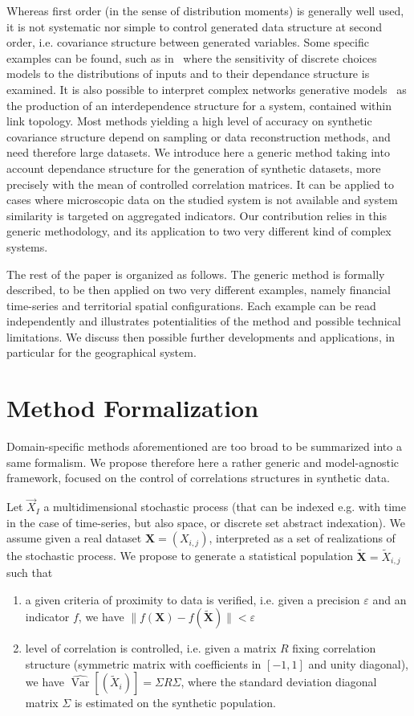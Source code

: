 \documentclass{bmcart}
\DeclareMathOperator{\Var}{Var}
\newcommand{\norm}[1]{\| #1 \|}
\begin{document}
Whereas first order (in the sense of distribution moments) is generally well used, it is not systematic nor simple to control generated data structure at second order, i.e. covariance structure between generated variables. Some specific examples can be found, such as in~\cite{ye2011investigation} where the sensitivity of discrete choices models to the distributions of inputs and to their dependance structure is examined. It is also possible to interpret complex networks generative models~\cite{newman2003structure} as the production of an interdependence structure for a system, contained within link topology. Most methods yielding a high level of accuracy on synthetic covariance structure depend on sampling or data reconstruction methods, and need therefore large datasets. We introduce here a generic method taking into account dependance structure for the generation of synthetic datasets, more precisely with the mean of controlled correlation matrices. It can be applied to cases where microscopic data on the studied system is not available and system similarity is targeted on aggregated indicators. Our contribution relies in this generic methodology, and its application to two very different kind of complex systems.


The rest of the paper is organized as follows. The generic method is formally described, to be then applied on two very different examples, namely financial time-series and territorial spatial configurations. Each example can be read independently and illustrates potentialities of the method and possible technical limitations. We discuss then possible further developments and applications, in particular for the geographical system.


\section*{Method Formalization}


Domain-specific methods aforementioned are too broad to be summarized into a same formalism. We propose therefore here a rather generic and model-agnostic framework, focused on the control of correlations structures in synthetic data.

Let $\vec{X}_I$ a multidimensional stochastic process (that can be indexed e.g. with time in the case of time-series, but also space, or discrete set abstract indexation). We assume given a real dataset $\mathbf{X}=(X_{i,j})$, interpreted as a set of realizations of the stochastic process. We propose to generate a statistical population $\mathbf{\tilde{X}}=\tilde{X}_{i,j}$ such that
\begin{enumerate}
\item a given criteria of proximity to data is verified, i.e. given a precision $\varepsilon$ and an indicator $f$, we have $\norm{f(\mathbf{X})-f(\mathbf{\tilde{X}})} < \varepsilon$
\item level of correlation is controlled, i.e. given a matrix $R$ fixing correlation structure (symmetric matrix with coefficients in $[-1,1]$ and unity diagonal), we have $\hat{\Var{}}\left[(\tilde{X}_i)\right] = \Sigma R \Sigma$, where the standard deviation diagonal matrix $\Sigma$ is estimated on the synthetic population.
\end{enumerate}
\end{document}
